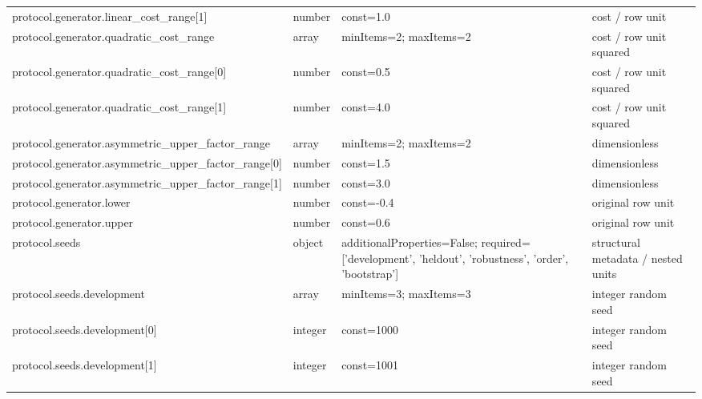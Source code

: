 \begin{longtable}{@{}>{\raggedright\arraybackslash}p{}>{\raggedright\arraybackslash}p{}>{\raggedright\arraybackslash}p{}>{\raggedright\arraybackslash}p{}@{}}
protocol.\allowbreak{}generator.\allowbreak{}linear\_\allowbreak{}cost\_\allowbreak{}range[1] & number & const=\allowbreak{}1.\allowbreak{}0 & cost /\allowbreak{} row unit\\
protocol.\allowbreak{}generator.\allowbreak{}quadratic\_\allowbreak{}cost\_\allowbreak{}range & array & minItems=\allowbreak{}2; maxItems=\allowbreak{}2 & cost /\allowbreak{} row unit squared\\
protocol.\allowbreak{}generator.\allowbreak{}quadratic\_\allowbreak{}cost\_\allowbreak{}range[0] & number & const=\allowbreak{}0.\allowbreak{}5 & cost /\allowbreak{} row unit squared\\
protocol.\allowbreak{}generator.\allowbreak{}quadratic\_\allowbreak{}cost\_\allowbreak{}range[1] & number & const=\allowbreak{}4.\allowbreak{}0 & cost /\allowbreak{} row unit squared\\
protocol.\allowbreak{}generator.\allowbreak{}asymmetric\_\allowbreak{}upper\_\allowbreak{}factor\_\allowbreak{}range & array & minItems=\allowbreak{}2; maxItems=\allowbreak{}2 & dimensionless\\
protocol.\allowbreak{}generator.\allowbreak{}asymmetric\_\allowbreak{}upper\_\allowbreak{}factor\_\allowbreak{}range[0] & number & const=\allowbreak{}1.\allowbreak{}5 & dimensionless\\
protocol.\allowbreak{}generator.\allowbreak{}asymmetric\_\allowbreak{}upper\_\allowbreak{}factor\_\allowbreak{}range[1] & number & const=\allowbreak{}3.\allowbreak{}0 & dimensionless\\
protocol.\allowbreak{}generator.\allowbreak{}lower & number & const=\allowbreak{}-0.\allowbreak{}4 & original row unit\\
protocol.\allowbreak{}generator.\allowbreak{}upper & number & const=\allowbreak{}0.\allowbreak{}6 & original row unit\\
protocol.\allowbreak{}seeds & object & additionalProperties=\allowbreak{}False; required=\allowbreak{}['development', 'heldout', 'robustness', 'order', 'bootstrap'] & structural metadata /\allowbreak{} nested units\\
protocol.\allowbreak{}seeds.\allowbreak{}development & array & minItems=\allowbreak{}3; maxItems=\allowbreak{}3 & integer random seed\\
protocol.\allowbreak{}seeds.\allowbreak{}development[0] & integer & const=\allowbreak{}1000 & integer random seed\\
protocol.\allowbreak{}seeds.\allowbreak{}development[1] & integer & const=\allowbreak{}1001 & integer random seed\\

\end{longtable}
